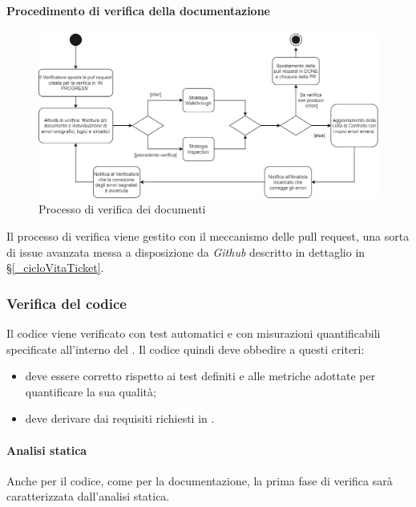 \paragraph{Procedimento di verifica della documentazione}
\begin{figure}[h!]
    \includegraphics[width=\linewidth]{res/images/processo_verifica.png}
    \caption{Processo di verifica  dei documenti}
\end{figure}
Il processo di verifica viene gestito con il meccanismo delle pull request, una sorta di issue avanzata messa a disposizione da \textit{Github} descritto in dettaglio in \S\ref{_cicloVitaTicket}.

\subsubsection{Verifica del codice}
Il codice viene verificato con test automatici e con misurazioni quantificabili specificate all'interno del . Il codice quindi deve obbedire a questi criteri:
\begin{itemize}
    \item deve essere corretto rispetto ai test definiti e alle metriche adottate per quantificare la sua qualità;
    \item deve derivare dai requisiti richiesti in .
\end{itemize}

\paragraph{Analisi statica}
Anche per il codice, come per la documentazione, la prima fase di verifica sarà caratterizzata dall'analisi statica. %


